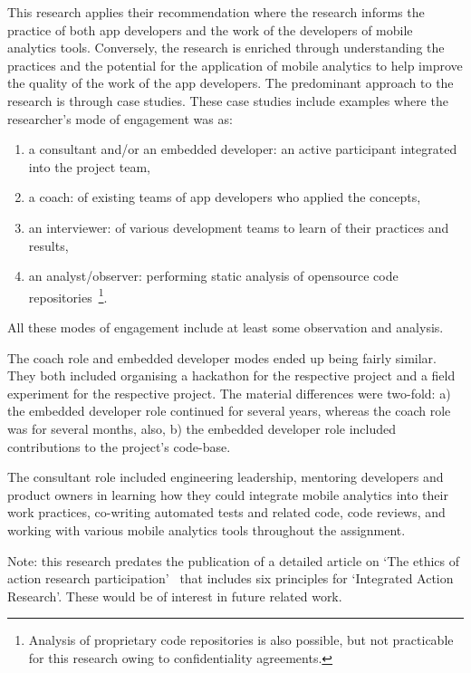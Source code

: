 This research applies their recommendation where the research informs the practice of both app developers and the work of the developers of mobile analytics tools. Conversely, the research is enriched through understanding the practices and the potential for the application of mobile analytics to help improve the quality of the work of the app developers. The predominant approach to the research is through case studies. These case studies include examples where the researcher's mode of engagement was as:
\begin{enumerate}
    \itemsep0em
    \item a consultant and/or an embedded developer: an active participant integrated into the project team,
    \item a coach: of existing teams of app developers who applied the concepts,
    \item an interviewer: of various development teams to learn of their practices and results,
    \item an analyst/observer: performing static analysis of opensource code repositories~\footnote{Analysis of proprietary code repositories is also possible, but not practicable for this research owing to confidentiality agreements.}.
\end{enumerate}

All these modes of engagement include at least some observation and analysis. 

The coach role and embedded developer modes ended up being fairly similar. They both included organising a hackathon for the respective project and a field experiment for the respective project. The material differences were two-fold: a) the embedded developer role continued for several years, whereas the coach role was for several months, also, b) the embedded developer role included contributions to the project's code-base. 

The consultant role included engineering leadership, mentoring developers and product owners in learning how they could integrate mobile analytics into their work practices, co-writing automated tests and related code, code reviews, and working with various mobile analytics tools throughout the assignment.

Note: this research predates the publication of a detailed article on `The ethics of action research participation'~\citep{davison2021_the_ethics_of_action_research_participation} that includes six principles for `Integrated Action Research'. These would be of interest in future related work.

